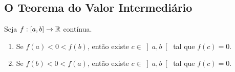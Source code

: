\subsection{O Teorema do Valor Intermediário}

\begin{theorem} \label{teo.calc1:anulamento_bolzano}
    Seja $f : [a,b] \to \mathbb{R}$ contínua. 
        \begin{enumerate}[leftmargin=*, align=left, label=\textbf{(\alph*)}]
            \item Se $f(a) < 0 < f(b)$, então existe $c \in \left] a,b \right[$ tal que $f(c) = 0$.
            \item Se $f(b) < 0 < f(a)$, então existe $c \in \left] a,b \right[$ tal que $f(c) = 0$.
        \end{enumerate}
\end{theorem}


